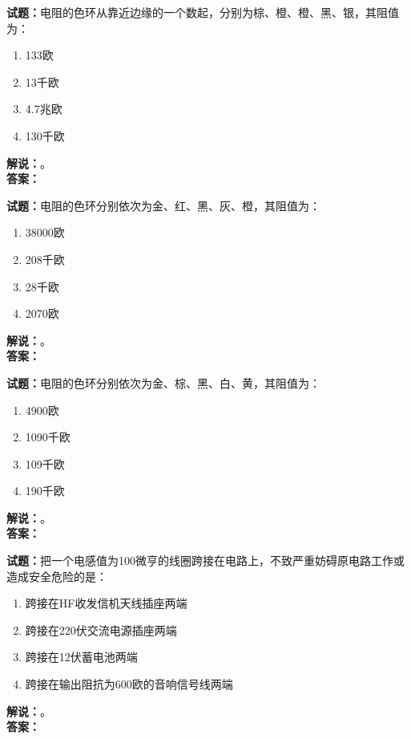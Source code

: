 \documentclass{ctexbook}
\begin{document}
\bigskip

\noindent\textbf{试题：}电阻的色环从靠近边缘的一个数起，分别为棕、橙、橙、黑、银，其阻值为：
\begin{enumerate}[leftmargin=3em]
  \item 133欧
  \item 13千欧
  \item 4.7兆欧
  \item 130千欧
\end{enumerate}
\noindent\textbf{解说：}\textbf{}。\\\noindent\textbf{答案：}

\bigskip

\noindent\textbf{试题：}电阻的色环分别依次为金、红、黑、灰、橙，其阻值为：
\begin{enumerate}[leftmargin=3em]
  \item 38000欧
  \item 208千欧
  \item 28千欧
  \item 2070欧
\end{enumerate}
\noindent\textbf{解说：}\textbf{}。\\\noindent\textbf{答案：}

\bigskip

\noindent\textbf{试题：}电阻的色环分别依次为金、棕、黑、白、黄，其阻值为：
\begin{enumerate}[leftmargin=3em]
  \item 4900欧
  \item 1090千欧
  \item 109千欧
  \item 190千欧
\end{enumerate}
\noindent\textbf{解说：}\textbf{}。\\\noindent\textbf{答案：}

\bigskip

\noindent\textbf{试题：}把一个电感值为100微亨的线圈跨接在电路上，不致严重妨碍原电路工作或造成安全危险的是：
\begin{enumerate}[leftmargin=3em]
  \item 跨接在HF收发信机天线插座两端
  \item 跨接在220伏交流电源插座两端
  \item 跨接在12伏蓄电池两端
  \item 跨接在输出阻抗为600欧的音响信号线两端
\end{enumerate}
\noindent\textbf{解说：}\textbf{}。\\\noindent\textbf{答案：}
\end{document}

